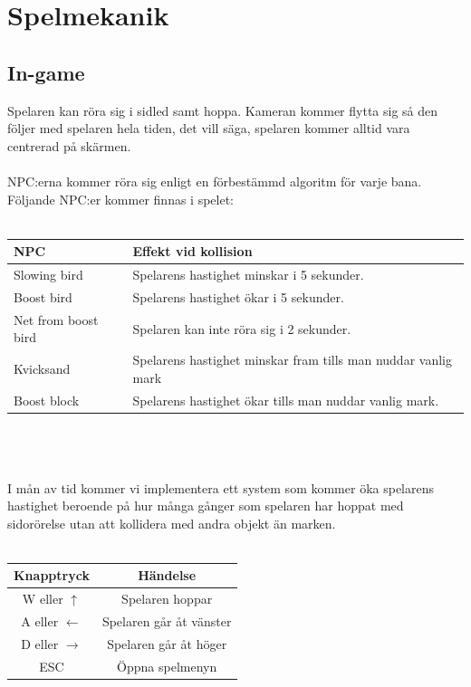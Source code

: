 \documentclass{TDP003mall}
\begin{document}
\newpage

\section{Spelmekanik}
\subsection{In-game}
Spelaren kan röra sig i sidled samt hoppa.
Kameran kommer flytta sig så den följer med spelaren hela tiden, det vill säga, spelaren kommer alltid vara centrerad på skärmen.
\\\\
NPC:erna kommer röra sig enligt en förbestämmd algoritm för varje bana. Följande NPC:er kommer finnas i spelet:
\\\\
\begin{tabular}{|l|l|}
\hline
\textbf{NPC} & \textbf{Effekt vid kollision} \\\hline
Slowing bird & Spelarens hastighet minskar i 5 sekunder. \\\hline
Boost bird & Spelarens hastighet ökar i 5 sekunder. \\\hline
Net from boost bird & Spelaren kan inte röra sig i 2 sekunder. \\\hline
Kvicksand & Spelarens hastighet minskar fram tills man nuddar vanlig mark \\\hline
Boost block & Spelarens hastighet ökar tills man nuddar vanlig mark. \\\hline
\end{tabular}
\\\\
\\
I mån av tid kommer vi implementera ett system som kommer öka spelarens hastighet beroende på hur många gånger som spelaren har hoppat med sidorörelse utan att kollidera med andra objekt än marken.
\\\\
\begin{tabular}{|c|c|}
\hline
\textbf{Knapptryck} & \textbf{Händelse} \\\hline
W eller $\uparrow$ & Spelaren hoppar \\\hline
A eller $\leftarrow$ & Spelaren går åt vänster \\\hline
D eller $\rightarrow$ & Spelaren går åt höger \\\hline
ESC & Öppna spelmenyn \\\hline
\end{tabular}
\end{document}
